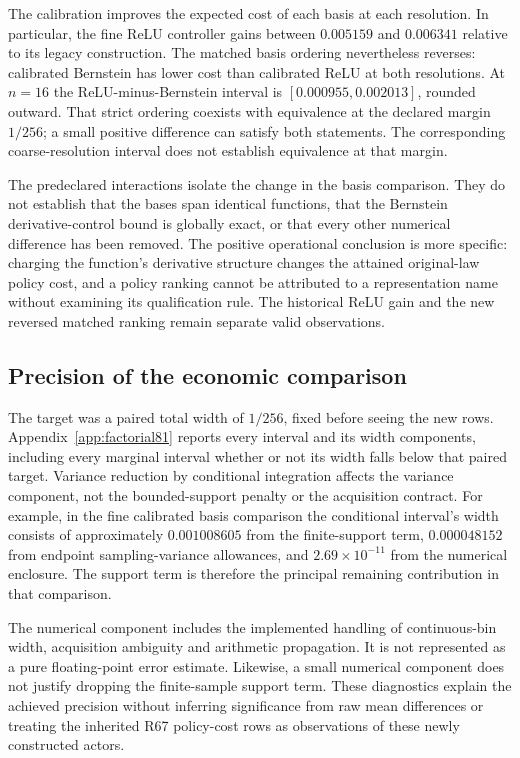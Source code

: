 


The calibration improves the expected cost of each basis at each resolution. In particular, the fine ReLU controller gains between $0.005159$ and $0.006341$ relative to its legacy construction. The matched basis ordering nevertheless reverses: calibrated Bernstein has lower cost than calibrated ReLU at both resolutions. At $n=16$ the ReLU-minus-Bernstein interval is $[0.000955,0.002013]$, rounded outward. That strict ordering coexists with equivalence at the declared margin $1/256$; a small positive difference can satisfy both statements. The corresponding coarse-resolution interval does not establish equivalence at that margin.



The predeclared interactions isolate the change in the basis comparison. They do not establish that the bases span identical functions, that the Bernstein derivative-control bound is globally exact, or that every other numerical difference has been removed. The positive operational conclusion is more specific: charging the function's derivative structure changes the attained original-law policy cost, and a policy ranking cannot be attributed to a representation name without examining its qualification rule. The historical ReLU gain and the new reversed matched ranking remain separate valid observations.

\subsection{Precision of the economic comparison}
The target was a paired total width of $1/256$, fixed before seeing the new rows. Appendix~\ref{app:factorial81} reports every interval and its width components, including every marginal interval whether or not its width falls below that paired target. Variance reduction by conditional integration affects the variance component, not the bounded-support penalty or the acquisition contract. For example, in the fine calibrated basis comparison the conditional interval's width consists of approximately $0.001008605$ from the finite-support term, $0.000048152$ from endpoint sampling-variance allowances, and $2.69\times10^{-11}$ from the numerical enclosure. The support term is therefore the principal remaining contribution in that comparison.

The numerical component includes the implemented handling of continuous-bin width, acquisition ambiguity and arithmetic propagation. It is not represented as a pure floating-point error estimate. Likewise, a small numerical component does not justify dropping the finite-sample support term. These diagnostics explain the achieved precision without inferring significance from raw mean differences or treating the inherited R67 policy-cost rows as observations of these newly constructed actors.

